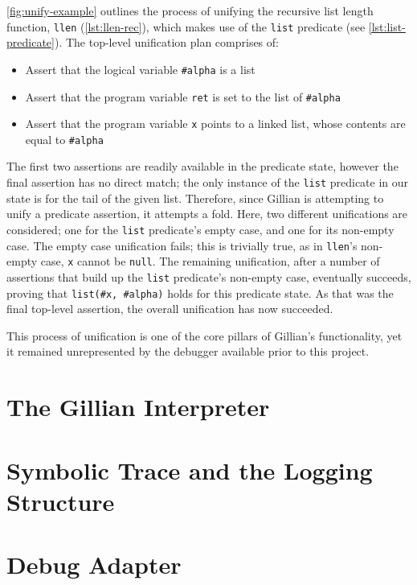 \autoref{fig:unify-example} outlines the process of unifying the recursive list
length function, \texttt{llen} (\autoref{lst:llen-rec}), which makes use of the
\texttt{list} predicate (see \autoref{lst:list-predicate}). The top-level
unification plan comprises of:
\begin{itemize}
  \item Assert that the logical variable \texttt{\#alpha} is a list
  \item Assert that the program variable \texttt{ret} is set to the list of
  \texttt{\#alpha}
  \item Assert that the program variable \texttt{x} points to a linked list,
  whose contents are equal to \texttt{\#alpha}
\end{itemize}
The first two assertions are readily available in the predicate state, however
the final assertion has no direct match; the only instance of the \texttt{list}
predicate in our state is for the tail of the given list. Therefore, since
Gillian is attempting to unify a predicate assertion, it attempts a fold.
Here, two different unifications are considered; one for the \texttt{list}
predicate's empty case, and one for its non-empty case. The empty case
unification fails; this is trivially true, as in \texttt{llen}'s non-empty case,
\texttt{x} cannot be \texttt{null}. The remaining unification, after a number of
assertions that build up the \texttt{list} predicate's non-empty case,
eventually succeeds, proving that \texttt{list(\#x, \#alpha)} holds for this
predicate state. As that was the final top-level assertion, the overall
unification has now succeeded.

This process of unification is one of the core pillars of Gillian's
functionality, yet it remained unrepresented by the debugger available prior to
this project.


\section{The Gillian Interpreter}\label{sec:current:interpreter}

\section{Symbolic Trace and the Logging Structure}\label{sec:current:trace}

\section{Debug Adapter}\label{sec:current:dap}

